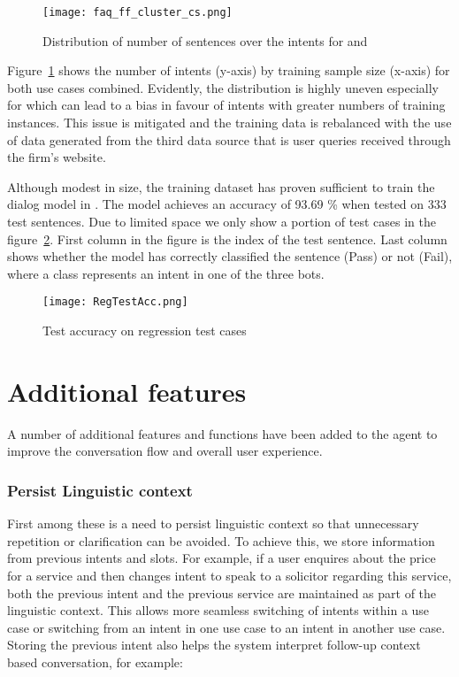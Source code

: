 \documentclass[runningheads]{llncs}
\begin{document}
%
\begin{figure}[t]
    \texttt{[image: faq\_ff\_cluster\_cs.png]}
\caption{Distribution of number of sentences over the intents for \faq and \ff}\label{fig:distribution}
\end{figure}
%

Figure~\ref{fig:distribution} shows the number of intents (y-axis) by training sample size (x-axis) for both use cases combined. Evidently, the distribution is highly uneven especially for \ff which can lead to a bias in favour of intents with greater numbers of training instances. 
This issue is mitigated and the training data is rebalanced with the use of data generated from the third data source that is user queries received through the firm's website.

Although modest in size, the training dataset has proven sufficient to train the dialog model in \lex. The \lex model achieves an accuracy of 93.69 \% when tested on $333$ test sentences. Due to limited space we only show a portion of test cases in the figure~\ref{fig:Regression Testcases}. First column in the figure is the index of the test sentence. Last column shows whether the model has correctly classified the sentence (Pass) or not (Fail), where a class represents an intent in one of the three bots.

%
\begin{figure}[t]
    \hspace{13.0em}
    \texttt{[image: RegTestAcc.png]}
\caption{Test accuracy on regression test cases}\label{fig:Regression Testcases}
\end{figure}
%


\section{Additional features}\label{sec:add features}
A number of additional features and functions have been added to the agent to improve the conversation flow and overall user experience.

\subsubsection{Persist Linguistic context}
First among these is a need to persist linguistic context so that unnecessary repetition or clarification can be avoided. To achieve this, we store information from previous intents and slots. For example, if a user enquires about the price for a service and then changes intent to speak to a solicitor regarding this service, both the previous intent and the previous service are maintained as part of the linguistic context. This allows more seamless switching of intents within a use case or switching from an intent in one use case to an intent in another use case. Storing the previous intent also helps the system interpret follow-up context based conversation, for example:\\
\end{document}
